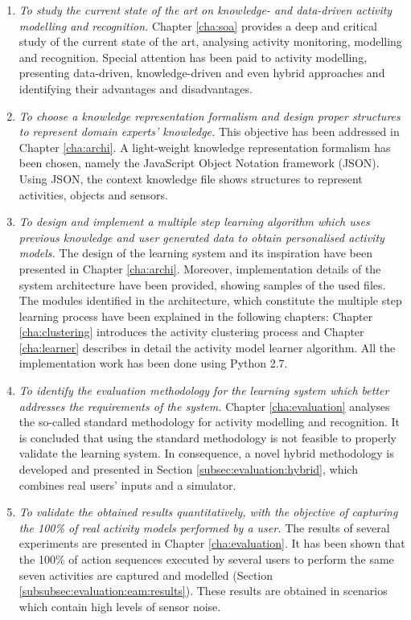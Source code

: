 \begin{enumerate}
 \item \textit{To study the current state of the art on knowledge- and data-driven activity modelling and recognition.} Chapter \ref{cha:soa} provides a deep and critical study of the current state of the art, analysing activity monitoring, modelling and recognition. Special attention has been paid to activity modelling, presenting data-driven, knowledge-driven and even hybrid approaches and identifying their advantages and disadvantages.
 \item \textit{To choose a knowledge representation formalism and design proper structures to represent domain experts' knowledge.} This objective has been addressed in Chapter \ref{cha:archi}. A light-weight knowledge representation formalism has been chosen, namely the JavaScript Object Notation framework (JSON). Using JSON, the context knowledge file shows structures to represent activities, objects and sensors.
 \item \textit{To design and implement a multiple step learning algorithm which uses previous knowledge and user generated data to obtain personalised activity models.} The design of the learning system and its inspiration have been presented in Chapter \ref{cha:archi}. Moreover, implementation details of the system architecture have been provided, showing samples of the used files. The modules identified in the architecture, which constitute the multiple step learning process have been explained in the following chapters: Chapter \ref{cha:clustering} introduces the activity clustering process and Chapter \ref{cha:learner} describes in detail the activity model learner algorithm. All the implementation work has been done using Python 2.7.
 \item \textit{To identify the evaluation methodology for the learning system which better addresses the requirements of the system.} Chapter \ref{cha:evaluation} analyses the so-called standard methodology for activity modelling and recognition. It is concluded that using the standard methodology is not feasible to properly validate the learning system. In consequence, a novel hybrid methodology is developed and presented in Section \ref{subsec:evaluation:hybrid}, which combines real users' inputs and a simulator. 
 \item \textit{To validate the obtained results quantitatively, with the objective of capturing the 100\% of real activity models performed by a user.} The results of several experiments are presented in Chapter \ref{cha:evaluation}. It has been shown that the 100\% of action sequences executed by several users to perform the same seven activities are captured and modelled (Section \ref{subsubsec:evaluation:eam:results}). These results are obtained in scenarios which contain high levels of sensor noise. 
\end{enumerate}


